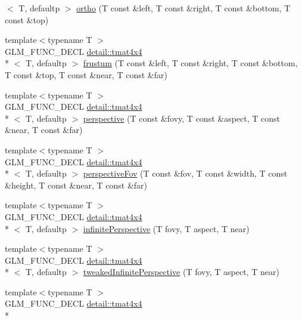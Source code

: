 \begin{DoxyCompactItemize}
$<$ T, defaultp $>$ \hyperlink{group__gtc__matrix__transform_gab03587bce3510aa5d2f4e5f1be6c2370}{ortho} (T const \&left, T const \&right, T const \&bottom, T const \&top)
\item 
{\footnotesize template$<$typename T $>$ }\\G\-L\-M\-\_\-\-F\-U\-N\-C\-\_\-\-D\-E\-C\-L \hyperlink{structglm_1_1detail_1_1tmat4x4}{detail\-::tmat4x4}\\*
$<$ T, defaultp $>$ \hyperlink{group__gtc__matrix__transform_ga486d3d6819c04880559f3dccd38f9f58}{frustum} (T const \&left, T const \&right, T const \&bottom, T const \&top, T const \&near, T const \&far)
\item 
{\footnotesize template$<$typename T $>$ }\\G\-L\-M\-\_\-\-F\-U\-N\-C\-\_\-\-D\-E\-C\-L \hyperlink{structglm_1_1detail_1_1tmat4x4}{detail\-::tmat4x4}\\*
$<$ T, defaultp $>$ \hyperlink{group__gtc__matrix__transform_ga6c82aa0ea748cfbb16887d81cf6c5a10}{perspective} (T const \&fovy, T const \&aspect, T const \&near, T const \&far)
\item 
{\footnotesize template$<$typename T $>$ }\\G\-L\-M\-\_\-\-F\-U\-N\-C\-\_\-\-D\-E\-C\-L \hyperlink{structglm_1_1detail_1_1tmat4x4}{detail\-::tmat4x4}\\*
$<$ T, defaultp $>$ \hyperlink{group__gtc__matrix__transform_gac00bf68d4f7ec62380b84c5354567f71}{perspective\-Fov} (T const \&fov, T const \&width, T const \&height, T const \&near, T const \&far)
\item 
{\footnotesize template$<$typename T $>$ }\\G\-L\-M\-\_\-\-F\-U\-N\-C\-\_\-\-D\-E\-C\-L \hyperlink{structglm_1_1detail_1_1tmat4x4}{detail\-::tmat4x4}\\*
$<$ T, defaultp $>$ \hyperlink{group__gtc__matrix__transform_ga63ba1ddb9c4a08d4e58becd0dc5b725a}{infinite\-Perspective} (T fovy, T aspect, T near)
\item 
{\footnotesize template$<$typename T $>$ }\\G\-L\-M\-\_\-\-F\-U\-N\-C\-\_\-\-D\-E\-C\-L \hyperlink{structglm_1_1detail_1_1tmat4x4}{detail\-::tmat4x4}\\*
$<$ T, defaultp $>$ \hyperlink{group__gtc__matrix__transform_ga9d67732836d71a79dc21eb8f87603cb7}{tweaked\-Infinite\-Perspective} (T fovy, T aspect, T near)
\item 
{\footnotesize template$<$typename T $>$ }\\G\-L\-M\-\_\-\-F\-U\-N\-C\-\_\-\-D\-E\-C\-L \hyperlink{structglm_1_1detail_1_1tmat4x4}{detail\-::tmat4x4}\\*

\end{DoxyCompactItemize}
